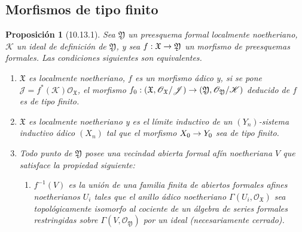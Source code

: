 \documentclass[oneside]{amsart}
\theoremstyle{ega-env-style}
\theoremstyle{ega-thm-env-style}
\newtheorem*{proposition}{Proposición}
\theoremstyle{ega-defn-env-style}
\renewcommand{\to}{\mathchoice{\longrightarrow}{\rightarrow}{\rightarrow}{\rightarrow}}
\newcommand{\oldpage}[2][]{{\marginnote{\normalfont{\textbf{#1}~|~#2}}}\ignorespaces}
\let\EGAOriginalLabel\label
\renewcommand{\label}[1]{\phantomsection\EGAOriginalLabel{#1}}
\begin{document}
\subsection{Morfismos de tipo finito}
\label{subsection:I.10.13}

\begin{proposition}[10.13.1]
\label{I.10.13.1}
Sea $\mathfrak{Y}$ un preesquema formal localmente noetheriano, $\mathscr{K}$ un ideal de definición de $\mathfrak{Y}$, y sea $f:\mathfrak{X}\to\mathfrak{Y}$ un morfismo de preesquemas formales.
Las condiciones siguientes son equivalentes.
\begin{enumerate}
  \item[\textup{a)}] $\mathfrak{X}$ es localmente noetheriano, $f$ es un morfismo ádico  y, si se pone $\mathscr{J}=f^*(\mathscr{K})\mathscr{O}_{\mathfrak{X}}$, el morfismo $f_0:(\mathfrak{X},\mathscr{O}_{\mathfrak{X}}/\mathscr{J})
    \to(\mathfrak{Y},\mathscr{O}_{\mathfrak{Y}}/\mathscr{K})$ deducido de $f$ es de tipo finito.
  \item[\textup{b)}] $\mathfrak{X}$ es localmente noetheriano y es el límite inductivo de un $(Y_n)$-sistema inductivo ádico $(X_n)$ tal que el morfismo $X_0\to Y_0$ sea de tipo finito.
\oldpage[I]{208}
  \item[\textup{c)}] Todo punto de $\mathfrak{Y}$ posee una vecindad abierta formal afín noetheriana $V$ que satisface la propiedad siguiente:
\begin{enumerate}
  \item[\textup{(Q)}] $f^{-1}(V)$ es la unión de una familia finita de abiertos formales afines noetherianos $U_i$ tales que el anillo ádico noetheriano $\Gamma(U_i,\mathscr{O}_{\mathfrak{X}})$ sea topológicamente isomorfo al cociente de un álgebra de series formales restringidas  sobre $\Gamma(V,\mathscr{O}_{\mathfrak{Y}})$ por un ideal (necesariamente cerrado).
\end{enumerate}
\end{enumerate}
\end{proposition}
\end{document}
